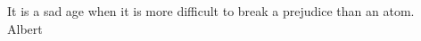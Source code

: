 \documentclass[a4paper,12pt,bibliography=totoc,index=totoc,twoside,francais]{scrbook}
\let\Oldgls\gls%
\renewcommand{\gls}[1]{%
\textbf{\Oldgls{#1}}%
}
\begin{document}


\frontmatter
\begin{flushright}
It is a sad age when it is more difficult to break a prejudice than an atom.\\
Albert \\
\end{flushright}

\tableofcontents
\listoftables
\listoffigures

\mainmatter




%





%
%

\backmatter
\nocite{*}

\printindex

\glsaddall

\printglossary[type=acronym,title=Acronymes,toctitle=Acronymes]
\printglossary[type=main,title=Glossaire,toctitle=Glossaire]

\printbibliography

\cleardoublepage

\end{document}
